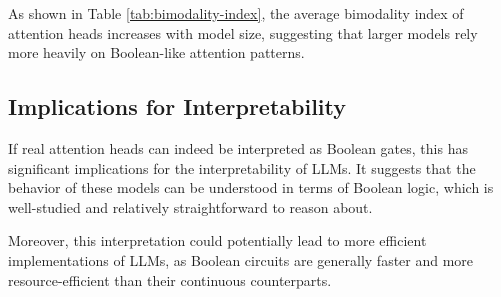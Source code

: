 As shown in Table \ref{tab:bimodality-index}, the average bimodality index of attention heads increases with model size, suggesting that larger models rely more heavily on Boolean-like attention patterns.













\subsection{Implications for Interpretability}






If real attention heads can indeed be interpreted as Boolean gates, this has significant implications for the interpretability of LLMs. It suggests that the behavior of these models can be understood in terms of Boolean logic, which is well-studied and relatively straightforward to reason about.













Moreover, this interpretation could potentially lead to more efficient implementations of LLMs, as Boolean circuits are generally faster and more resource-efficient than their continuous counterparts.












































